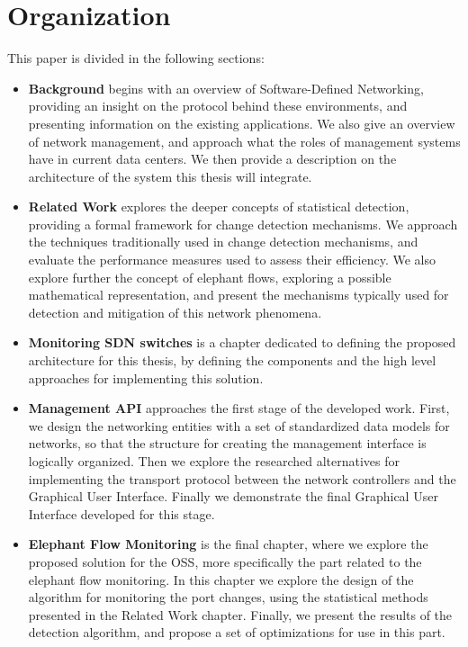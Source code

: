 \section{Organization}


This paper is divided in the following sections:

\begin{itemize}
    \item \textbf{Background} begins with an overview of Software-Defined Networking, providing an insight on the protocol behind these environments,
and presenting information on the existing applications. We also give an overview of network management, and approach what the roles of management systems have
in current data centers. We then provide a description on the architecture of the system this thesis will integrate.

    \item \textbf{Related Work} explores the deeper concepts of statistical detection, providing a formal framework for change detection mechanisms. We approach
the techniques traditionally used in change detection mechanisms, and evaluate the performance measures used to assess their efficiency. We also explore further
the concept of elephant flows, exploring a possible mathematical representation, and present the mechanisms typically used for detection and mitigation of this 
network phenomena.

    \item \textbf{Monitoring SDN switches} is a chapter dedicated to defining the proposed architecture for this thesis, by defining the components and the high
level approaches for implementing this solution.

    \item \textbf{Management API} approaches the first stage of the developed work. First, we design the networking entities with a set of standardized data models
for networks, so that the structure for creating the management interface is logically organized. Then we explore the researched alternatives for implementing
the transport protocol between the network controllers and the Graphical User Interface. Finally we demonstrate the final Graphical User Interface developed for 
this stage. 

    \item \textbf{Elephant Flow Monitoring} is the final chapter, where we explore the proposed solution for the OSS, more specifically the part related to the 
elephant flow monitoring. In this chapter we explore the design of the algorithm for monitoring the port changes, using the statistical methods presented in 
the Related Work chapter. Finally, we present the results of the detection algorithm, and propose a set of optimizations for use in this part.
\end{itemize}
